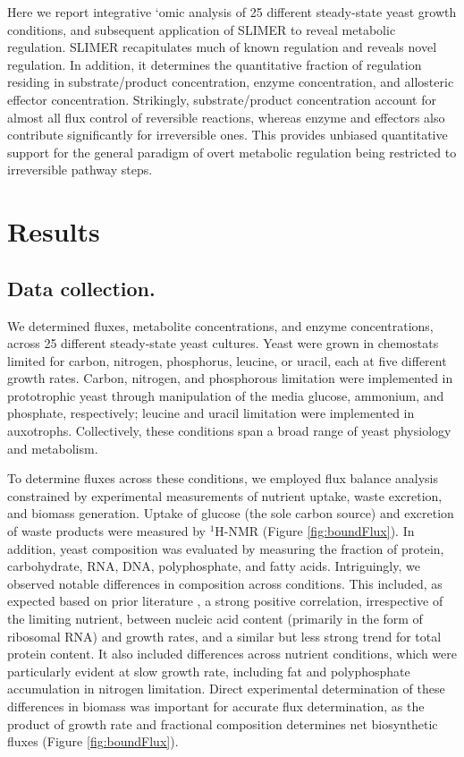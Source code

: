 Here we report integrative `omic analysis of 25 different steady-state yeast growth conditions, and subsequent application of SLIMER to reveal metabolic regulation. SLIMER recapitulates much of known regulation and reveals novel regulation. In addition, it determines the quantitative fraction of regulation residing in substrate/product concentration, enzyme concentration, and allosteric effector concentration. Strikingly, substrate/product concentration account for almost all flux control of reversible reactions, whereas enzyme and effectors also contribute significantly for irreversible ones. This provides unbiased quantitative support for the general paradigm of overt metabolic regulation being restricted to irreversible pathway steps. 

\section{Results}

\subsection{Data collection.}

We determined fluxes, metabolite concentrations, and enzyme concentrations, across 25 different steady-state yeast cultures. Yeast were grown in chemostats limited for carbon, nitrogen, phosphorus, leucine, or uracil, each at five different growth rates. Carbon, nitrogen, and phosphorous limitation were implemented in prototrophic yeast through manipulation of the media glucose, ammonium, and phosphate, respectively; leucine and uracil limitation were implemented in auxotrophs. Collectively, these conditions span a broad range of yeast physiology and metabolism.

To determine fluxes across these conditions, we employed flux balance analysis constrained by experimental measurements of nutrient uptake, waste excretion, and biomass generation. Uptake of glucose (the sole carbon source) and excretion of waste products were measured by $^{1}$H-NMR (Figure \ref{fig:boundFlux}). In addition, yeast composition was evaluated by measuring the fraction of protein, carbohydrate, RNA, DNA, polyphosphate, and fatty acids. Intriguingly, we observed notable differences in composition across conditions. This included, as expected based on prior literature \cite{Schulze:1995uv, Lange:2001th}, a strong positive correlation, irrespective of the limiting nutrient, between nucleic acid content (primarily in the form of ribosomal RNA) and growth rates, and a similar but less strong trend for total protein content. It also included differences across nutrient conditions, which were particularly evident at slow growth rate, including fat and polyphosphate accumulation in nitrogen limitation. Direct experimental determination of these differences in biomass was important for accurate flux determination, as the product of growth rate and fractional composition determines net biosynthetic fluxes (Figure \ref{fig:boundFlux}).

